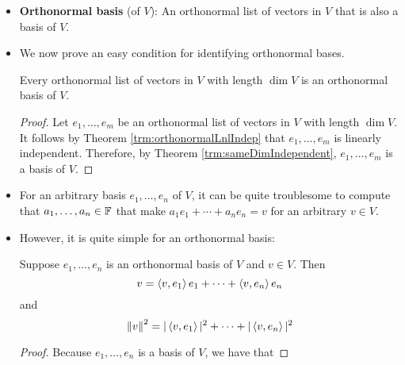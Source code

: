 \documentclass[../main.tex]{subfiles}
\begin{document}
\begin{itemize}
\begin{theorem}
\begin{proof}
            Let $e_1,\dots,e_m$ be an orthonormal list of vectors, and let $a_1,\dots,a_m\in\F$ be such that $a_1e_1+\cdots+a_me_m=0$. Then
            \begin{align*}
                0 &= \norm{0}\\
                &= \norm{a_1e_1+\cdots+a_me_m}\\
                &= |a_1|^2+\cdots+|a_m|^2\tag*{Theorem \ref{trm:normOrthoLnlComb}}
            \end{align*}
            But this implies that each $a_j=0$, as desired.
        \end{proof}
    \end{theorem}
    \item \textbf{Orthonormal basis} (of $V$): An orthonormal list of vectors in $V$ that is also a basis of $V$.
    \item We now prove an easy condition for identifying orthonormal bases.
    \begin{theorem}\label{trm:dimOrthonormal}
        Every orthonormal list of vectors in $V$ with length $\dim V$ is an orthonormal basis of $V$.
        \begin{proof}
            Let $e_1,\dots,e_m$ be an orthonormal list of vectors in $V$ with length $\dim V$. It follows by Theorem \ref{trm:orthonormalLnlIndep} that $e_1,\dots,e_m$ is linearly independent. Therefore, by Theorem \ref{trm:sameDimIndependent}, $e_1,\dots,e_m$ is a basis of $V$.
        \end{proof}
    \end{theorem}
    \item {}For an arbitrary basis $e_1,\dots,e_n$ of $V$, it can be quite troublesome to compute that $a_1,\dots,a_n\in\mathbb{F}$ that make $a_1e_1+\cdots+a_ne_n=v$ for an arbitrary $v\in V$.
    \item However, it is quite simple for an orthonormal basis:
    \begin{theorem}\label{trm:linCombOrthonormal}
        Suppose $e_1,\dots,e_n$ is an orthonormal basis of $V$ and $v\in V$. Then
        \begin{equation*}
            v = \left\langle{v},{e_1}\right\rangle e_1+\cdots+\left\langle{v},{e_n}\right\rangle e_n
        \end{equation*}
        and
        \begin{equation*}
            \norm{v}^2 = |\left\langle{v},{e_1}\right\rangle|^2+\cdots+|\left\langle{v},{e_n}\right\rangle|^2
        \end{equation*}
        \begin{proof}
            Because $e_1,\dots,e_n$ is a basis of $V$, we have that

\end{proof}
\end{theorem}
\end{itemize}
\end{document}
